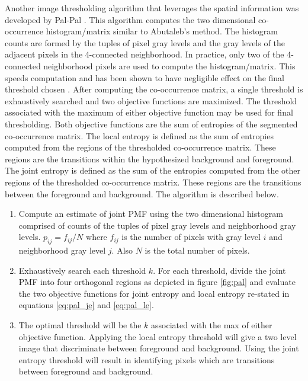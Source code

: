 \documentclass[journal]{IEEEtran}
\begin{document}
\par Another image thresholding algorithm that leverages the spatial information was developed by Pal-Pal \cite{pal}. This algorithm computes the two dimensional co-occurrence histogram/matrix similar to Abutaleb's method. The histogram counts are formed by the tuples of pixel gray levels and the gray levels of the adjacent pixels in the 4-connected neighborhood. In practice, only two of the 4-connected neighborhood pixels are used to compute the histogram/matrix. This speeds computation and has been shown to have negligible effect on the final threshold chosen \cite{chang}. After computing the co-occurrence matrix, a single threshold is exhaustively searched and two objective functions are maximized. The threshold associated with the maximum of either objective function may be used for final thresholding. Both objective functions are the sum of entropies of the segmented co-occurrence matrix. The local entropy is defined as the sum of entropies computed from the regions of the thresholded co-occurrence matrix. These regions are the transitions within the hypothesized background and foreground. The joint entropy is defined as the sum of the entropies computed from the other regions of the thresholded co-occurrence matrix. These regions are the transitions between the foreground and background. The algorithm is described below.
\begin{enumerate}
\item Compute an estimate of joint PMF using the two dimensional histogram comprised of counts of the tuples of pixel gray levels and neighborhood gray levels. \begin{math}p_{ij} = f_{ij}/N\end{math} where \begin{math}f_{ij}\end{math} is the number of pixels with gray level \begin{math}i\end{math} and neighborhood gray level \begin{math}j\end{math}. Also \begin{math}N\end{math} is the total number of pixels.
\item Exhaustively search each threshold \begin{math}k\end{math}. For each threshold, divide the joint PMF into four orthogonal regions as depicted in figure \ref{fig:pal} and evaluate the two objective functions for joint entropy and local entropy re-stated in equations \ref{eq:pal_je} and \ref{eq:pal_le}.
\item The optimal threshold will be the \begin{math}k\end{math} associated with the max of either objective function. Applying the local entropy threshold will give a two level image that discriminate between foreground and background. Using the joint entropy threshold will result in identifying pixels which are transitions between foreground and background.
\end{enumerate}
\end{document}

